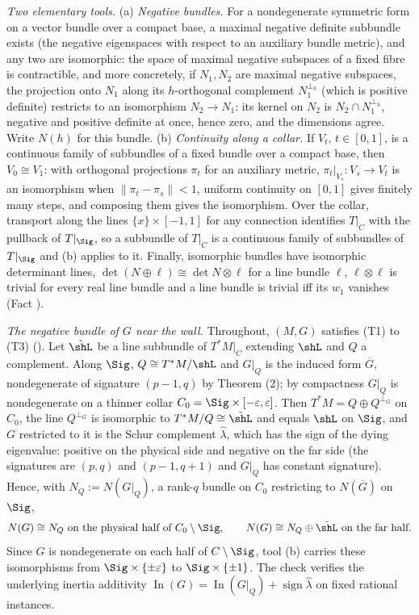 \emph{Two elementary tools.} (a) \emph{Negative bundles.} For a nondegenerate symmetric form on a vector bundle over a compact base, a maximal negative definite subbundle exists (the negative eigenspaces with respect to an auxiliary bundle metric), and any two are isomorphic: the space of maximal negative subspaces of a fixed fibre is contractible, and more concretely, if $N_1, N_2$ are maximal negative subspaces, the projection onto $N_1$ along its $h$-orthogonal complement $N_1^{\perp_h}$ (which is positive definite) restricts to an isomorphism $N_2 \to N_1$: its kernel on $N_2$ is $N_2 \cap N_1^{\perp_h}$, negative and positive definite at once, hence zero, and the dimensions agree. Write $N(h)$ for this bundle. (b) \emph{Continuity along a collar.} If $V_t$, $t \in [0,1]$, is a continuous family of subbundles of a fixed bundle over a compact base, then $V_0 \cong V_1$: with orthogonal projections $\pi_t$ for an auxiliary metric, $\pi_t|_{V_s} : V_s \to V_t$ is an isomorphism when $\|\pi_t - \pi_s\| < 1$, uniform continuity on $[0,1]$ gives finitely many steps, and composing them gives the isomorphism. Over the collar, transport along the lines $\{x\} \times [-1,1]$ for any connection identifies $T|_C$ with the pullback of $T|_\Sig$, so a subbundle of $T|_C$ is a continuous family of subbundles of $T|_\Sig$ and (b) applies to it. Finally, isomorphic bundles have isomorphic determinant lines, $\det(N \oplus \ell) \cong \det N \otimes \ell$ for a line bundle $\ell$, $\ell \otimes \ell$ is trivial for every real line bundle and a line bundle is trivial iff its $w_1$ vanishes (Fact ).

\emph{The negative bundle of $G$ near the wall.} Throughout, $(M,G)$ satisfies (T1) to (T3) (). Let $\tilde\shL$ be a line subbundle of $T^*M|_C$ extending $\shL$ and $Q$ a complement. Along $\Sig$, $Q \cong T^*M/\shL$ and $G|_Q$ is the induced form $\overline G$, nondegenerate of signature $(p{-}1,q)$ by Theorem (2); by compactness $G|_Q$ is nondegenerate on a thinner collar $C_0 = \Sig \times [-\varepsilon, \varepsilon]$. Then $T^*M = Q \oplus Q^{\perp_G}$ on $C_0$, the line $Q^{\perp_G}$ is isomorphic to $T^*M/Q \cong \tilde\shL$ and equals $\shL$ on $\Sig$, and $G$ restricted to it is the Schur complement $\hat\lambda$, which has the sign of the dying eigenvalue: positive on the physical side and negative on the far side (the signatures are $(p,q)$ and $(p{-}1,q{+}1)$ and $G|_Q$ has constant signature). Hence, with $N_Q := N(G|_Q)$, a rank-$q$ bundle on $C_0$ restricting to $N(\overline G)$ on $\Sig$,
\[
N(G) \cong N_Q \ \text{on the physical half of } C_0 \setminus \Sig, \qquad N(G) \cong N_Q \oplus \tilde\shL \ \text{on the far half}.
\]
Since $G$ is nondegenerate on each half of $C \setminus \Sig$, tool (b) carries these isomorphisms from $\Sig \times \{\pm\varepsilon\}$ to $\Sig \times \{\pm 1\}$. The check verifies the underlying inertia additivity $\operatorname{In}(G) = \operatorname{In}(G|_Q) + \operatorname{sign}\hat\lambda$ on fixed rational instances.

